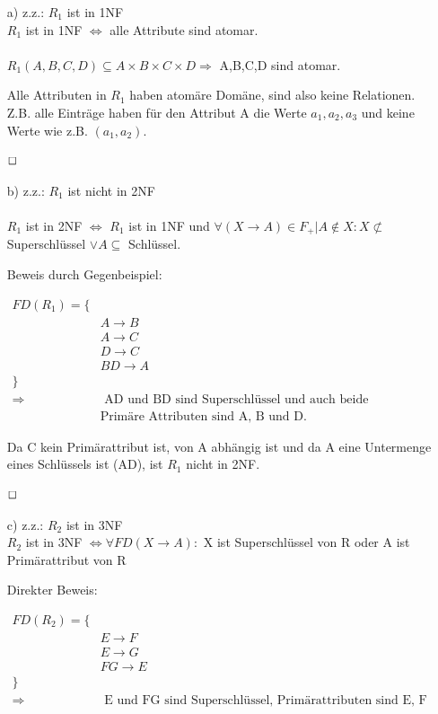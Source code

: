 \begin{enumerate}

\item[a)]
z.z.: $R_1$ ist in 1NF \\
$R_1$ ist in 1NF $\Leftrightarrow$ alle Attribute sind atomar. \\ \\
$R_1(A,B,C,D) \subseteq A \times B \times C \times D \Rightarrow $ A,B,C,D sind atomar.

Alle Attributen in $R_1$ haben atomäre Domäne, sind also keine Relationen. Z.B. alle Einträge haben für den Attribut A die Werte $a_1, a_2, a_3$ und keine Werte wie z.B. $(a_1, a_2)$.

$\hfill \Box$

\item[b)]
z.z.: $R_1$ ist nicht in 2NF \\ \\
$R_1$ ist in 2NF $\Leftrightarrow$  $R_1$ ist in 1NF und $\forall (X \rightarrow A) \in F_{+} | A \not\in X: X \not\subset $ Superschlüssel $\lor A \subseteq$ Schlüssel.

Beweis durch Gegenbeispiel:

\begin{align*}
    FD(R_1) = \{ & \\
    & A \rightarrow B \\
    & A \rightarrow C \\
    & D \rightarrow C \\
    & BD \rightarrow A \\
    \} & \\
    \Rightarrow & \text{ AD und BD sind Superschlüssel und auch beide Kandidatschlüsseln.} \\
    & \text{Primäre Attributen sind A, B und D. }
\end{align*}

Da C kein Primärattribut ist, von A abhängig ist und da A eine Untermenge eines Schlüssels ist (AD), ist $R_1$ nicht in 2NF.

$\hfill \Box$

\item[c)]
z.z.: $R_2$  ist in 3NF \\
$R_2$  ist in 3NF $\Leftrightarrow \forall FD(X \rightarrow A):$ X ist Superschlüssel von R oder A ist Primärattribut von R

Direkter Beweis: 

\begin{align*}
    FD(R_2) = \{ & \\
    & E \rightarrow F \\
    & E \rightarrow G \\
    & FG \rightarrow E \\
    \} & \\
    \Rightarrow & \text{ E und FG sind Superschlüssel, Primärattributen sind E, F und G. }
\end{align*}


\end{enumerate}
